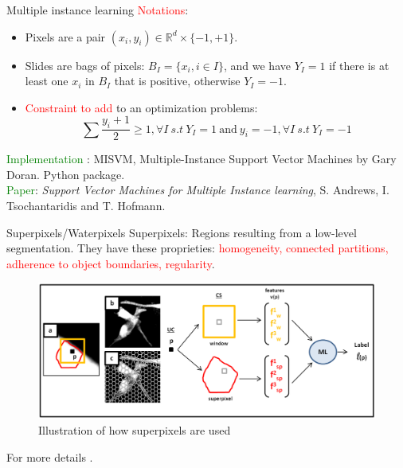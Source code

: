 \documentclass{beamer}
\begin{document}
\begin{frame}[noframenumbering]{Multiple instance learning}
\textcolor{red}{Notations}:
\begin{itemize}
\item Pixels are a pair $(x_i,y_i) \in \mathbb{R}^d \times \lbrace -1, +1\rbrace$.
\item Slides are bags of pixels: $B_I=\lbrace x_i, i\in I \rbrace$, and we have $Y_I=1$ if there is at least one $x_i$ in $B_I$ that is positive, otherwise $Y_I=-1$. 
\item \textcolor{red}{Constraint to add} to an optimization problems: \\
$$\sum \frac{y_i+1}{2} \geqslant 1, \forall I \ s.t \ Y_I=1 \ \text{and} \ y_i=-1, \forall I \ s.t \ Y_I=-1$$
\end{itemize}
\textcolor{green}{Implementation} : MISVM, Multiple-Instance Support Vector Machines by Gary Doran. Python package. \\
\textcolor{green}{Paper}: \textit{Support Vector Machines for Multiple Instance learning}, S. Andrews, I. Tsochantaridis and T. Hofmann.
\end{frame}


\begin{frame}[noframenumbering]{Superpixels/Waterpixels}
Superpixels: Regions resulting from a low-level segmentation. 
They have these proprieties: \textcolor{red}{homogeneity, connected partitions, adherence to object boundaries, regularity}.
\begin{figure}[!ht]
\centering
\includegraphics[width=\textwidth]{Waterpixels.png}
\caption{Illustration of how superpixels are used}
\label{}
\end{figure}
\begin{small}
For more details .
\end{small}
\end{frame}
\end{document}
